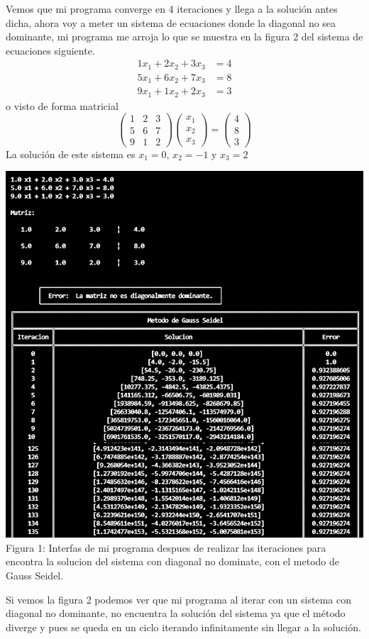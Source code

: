 \documentclass[12pt]{article}
\begin{document}
			Vemos que mi programa converge en 4 iteraciones y llega a la solución antes dicha, ahora voy a meter un sistema de ecuaciones 
			donde la diagonal no sea dominante, mi programa me arroja lo que se muestra en la figura 2 del sistema de ecuaciones siguiente.
			\begin{align*}
				1x_1 + 2x_2 + 3x_3 &= 4 \\
				5x_1 + 6x_2 + 7x_3 &= 8 \\
				9x_1 + 1x_2 + 2x_3 &= 3
			\end{align*}
			o visto de forma matricial
			$$
			\left(\begin{array}{ccc}
				1 & 2 & 3 \\
				5 & 6 & 7 \\
				9 & 1 & 2
			\end{array}\right)
			\left(\begin{array}{c}
				x_1 \\
				x_2 \\
				x_3 
			\end{array}\right)
			   =
			\left(\begin{array}{c}
			 4 \\
			 8 \\
			 3 
			\end{array}\right)
			$$
			La solución de este sistema es $ x_1 = 0 $, $ x_2 = -1 $ y $ x_3 = 2 $
			\begin{center}
				\includegraphics[width=\linewidth]{Figura 2.png}
				Figura 1: Interfas de mi programa despues de realizar las iteraciones para encontra la solucion del sistema con diagonal no dominate, con el metodo de Gauss Seidel.
			\end{center}
			Si vemos la figura 2 podemos ver que mi programa al iterar con un sistema con diagonal no dominante, no encuentra la solución del sistema ya que el método diverge y pues 
			se queda en un ciclo iterando infinitamente sin llegar a la solución.
\end{document}
